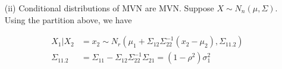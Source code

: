 \begin{itemize}
\begin{proof}
from which it is obvious that $M_{X_a, X_b}(t_a, t_b) = M_{X_a}(t_a) M_{X_b}(t_b)$ if and only if $V_{ab} = 0$.

\end{proof}

\item[(ii)] Conditional distributions of MVN are MVN. 
Suppose $X \sim N_n(\mu, \Sigma)$. Using the partition above, we have

\begin{align*}
	X_1 | X_2 &= x_2 \sim N_r(\mu_1 + \Sigma_{12} \Sigma_{22}^{-1} (x_2 - \mu_2), \Sigma_{11.2})\\
	\Sigma_{11.2} &= \Sigma_{11} - \Sigma_{12} \Sigma_{22}^{-1} \Sigma_{21} = (1 - \rho^2) \sigma_1^2
\end{align*}
\end{itemize}

